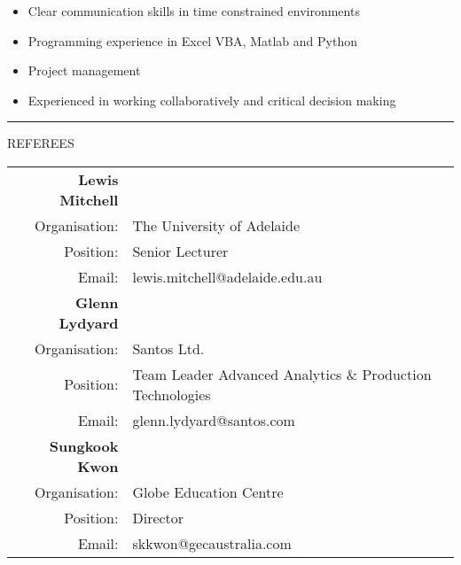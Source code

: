 \documentclass{article}
\newcommand{\HRule}{\rule{\linewidth}{0.5mm}}
\begin{document}
\begin{itemize}
\item Clear communication skills in time constrained environments
\item Programming experience in Excel VBA, Matlab and Python
\item Project management
\item Experienced in working collaboratively and critical decision making
\end{itemize}

\HRule


{\footnotesize REFEREES}

\begin{center}



\begin{tabular}[H]{ r l}
\textbf{\large Lewis Mitchell} & \\[0.3cm]
Organisation: & The University of Adelaide \\
Position: & Senior Lecturer \\
Email: & lewis.mitchell@adelaide.edu.au \\[1cm]

\textbf{\large Glenn Lydyard} & \\[0.3cm]
Organisation: & Santos Ltd. \\
Position: & Team Leader Advanced Analytics \& Production Technologies \\
Email: & glenn.lydyard@santos.com \\[1cm]

\textbf{\large Sungkook Kwon} & \\[0.3cm]
Organisation: & Globe Education Centre \\
Position: & Director \\
Email: & skkwon@gecaustralia.com \\[1cm]

\end{tabular}

\end{center}
\end{document}
